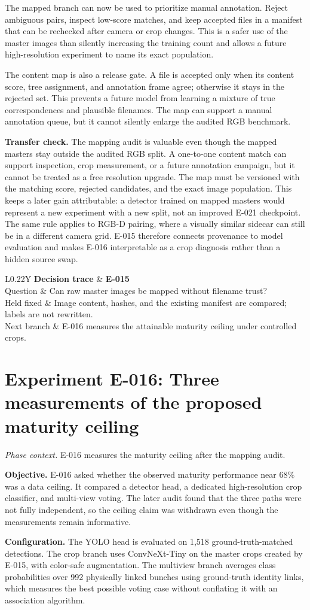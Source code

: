\documentclass[preprint,12pt]{elsarticle}
\newcommand{\experiment}[2]{\par\medskip\Needspace{7\baselineskip}\section{Experiment #1: #2}}
\newcommand{\decisioncard}[4]{%
\begin{table}[H]\centering\small
\begin{tabularx}{\columnwidth}{L{0.22\columnwidth}Y}
\toprule
\textbf{Decision trace} & \textbf{#1}\\
Question & #2\\
Held fixed & #3\\
Next branch & #4\\
\bottomrule
\end{tabularx}
\end{table}}
\newcommand{\phasecontext}[1]{%
\par\smallskip\noindent\textit{Phase context.} #1\par\smallskip}
\begin{document}
The mapped branch can now be used to prioritize manual annotation. Reject
ambiguous pairs, inspect low-score matches, and keep accepted files in a
manifest that can be rechecked after camera or crop changes. This is a safer
use of the master images than silently increasing the training count and
allows a future high-resolution experiment to name its exact population.

The content map is also a release gate. A file is accepted only when its
content score, tree assignment, and annotation frame agree; otherwise it stays
in the rejected set. This prevents a future model from learning a mixture of
true correspondences and plausible filenames. The map can support a manual
annotation queue, but it cannot silently enlarge the audited RGB benchmark.

\textbf{Transfer check.} The mapping audit is valuable even though the mapped
masters stay outside the audited RGB split. A one-to-one content match can
support inspection, crop measurement, or a future annotation campaign, but it
cannot be treated as a free resolution upgrade. The map must be versioned with
the matching score, rejected candidates, and the exact image population. This
keeps a later gain attributable: a detector trained on mapped masters would
represent a new experiment with a new split, not an improved E-021 checkpoint.
The same rule applies to RGB-D pairing, where a visually similar sidecar can
still be in a different camera grid. E-015 therefore connects provenance to
model evaluation and makes E-016 interpretable as a crop diagnosis rather
than a hidden source swap.

\decisioncard{E-015}{Can raw master images be mapped without filename trust?}{Image content, hashes, and the existing manifest are compared; labels are not rewritten.}{E-016 measures the attainable maturity ceiling under controlled crops.}
\experiment{E-016}{Three measurements of the proposed maturity ceiling}
\phasecontext{E-016 measures the maturity ceiling after the mapping audit.}
\textbf{Objective.} E-016 asked whether the observed maturity performance near
\(68\%\) was a data ceiling. It compared a detector head, a dedicated
high-resolution crop classifier, and multi-view voting. The later audit
found that the three paths were not fully independent, so the ceiling claim
was withdrawn even though the measurements remain informative.

\textbf{Configuration.} The YOLO head is evaluated on 1,518
ground-truth-matched detections. The crop branch uses ConvNeXt-Tiny on the
master crops created by E-015, with color-safe augmentation. The multiview
branch averages class probabilities over 992 physically linked bunches using
ground-truth identity links, which measures the best possible voting case
without conflating it with an association algorithm.
\end{document}
